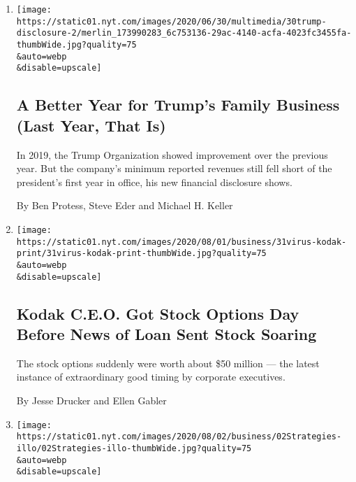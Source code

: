 \begin{enumerate}
\def\labelenumi{\arabic{enumi}.}
\item
  \href{/2020/07/31/business/trump-financial-disclosure.html}{}

  \texttt{[image: https://static01.nyt.com/images/2020/06/30/multimedia/30trump-disclosure-2/merlin\_173990283\_6c753136-29ac-4140-acfa-4023fc3455fa-thumbWide.jpg?quality=75\\\&auto=webp\\\&disable=upscale]}

  \hypertarget{a-better-year-for-trumps-family-business-last-year-that-is}{%
  \subsection{A Better Year for Trump's Family Business (Last Year, That
  Is)}\label{a-better-year-for-trumps-family-business-last-year-that-is}}

  In 2019, the Trump Organization showed improvement over the previous
  year. But the company's minimum reported revenues still fell short of
  the president's first year in office, his new financial disclosure
  shows.

  By Ben Protess, Steve Eder and Michael H. Keller
\item
  \href{/2020/07/31/business/kodak-ceo-stock-options.html}{}

  \texttt{[image: https://static01.nyt.com/images/2020/08/01/business/31virus-kodak-print/31virus-kodak-print-thumbWide.jpg?quality=75\\\&auto=webp\\\&disable=upscale]}

  \hypertarget{kodak-ceo-got-stock-options-day-before-news-of-loan-sent-stock-soaring}{%
  \subsection{Kodak C.E.O. Got Stock Options Day Before News of Loan
  Sent Stock
  Soaring}\label{kodak-ceo-got-stock-options-day-before-news-of-loan-sent-stock-soaring}}

  The stock options suddenly were worth about \$50 million --- the
  latest instance of extraordinary good timing by corporate executives.

  By Jesse Drucker and Ellen Gabler
\item
  \href{/2020/07/31/business/mutual-fund-winners-stocks-bonds.html}{}

  \texttt{[image: https://static01.nyt.com/images/2020/08/02/business/02Strategies-illo/02Strategies-illo-thumbWide.jpg?quality=75\\\&auto=webp\\\&disable=upscale]}


\end{enumerate}
